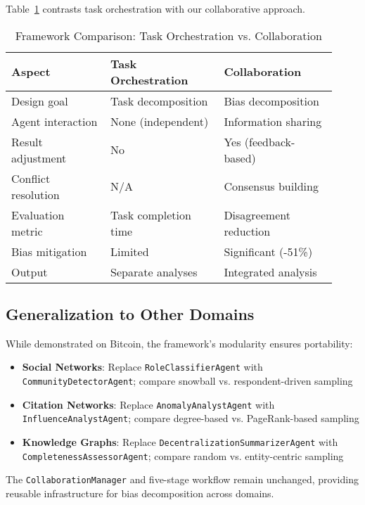 \documentclass[conference]{IEEEtran}
\begin{document}
Table~\ref{tab:framework-comparison} contrasts task orchestration with our collaborative approach.

\begin{table}[htbp]
\centering
\caption{Framework Comparison: Task Orchestration vs. Collaboration}
\label{tab:framework-comparison}
\small
\begin{tabular}{p{0.28\linewidth} p{0.32\linewidth} p{0.32\linewidth}}
\toprule
\textbf{Aspect} & \textbf{Task Orchestration} & \textbf{Collaboration} \\
\midrule
Design goal & Task decomposition & Bias decomposition \\
Agent interaction & None (independent) & Information sharing \\
Result adjustment & No & Yes (feedback-based) \\
Conflict resolution & N/A & Consensus building \\
Evaluation metric & Task completion time & Disagreement reduction \\
Bias mitigation & Limited & Significant (-51\%) \\
Output & Separate analyses & Integrated analysis \\
\bottomrule
\end{tabular}
\end{table}

\subsection{Generalization to Other Domains}

While demonstrated on Bitcoin, the framework's modularity ensures portability:
\begin{itemize}
    \item \textbf{Social Networks}: Replace \texttt{RoleClassifierAgent} with \texttt{CommunityDetectorAgent}; compare snowball vs. respondent-driven sampling
    \item \textbf{Citation Networks}: Replace \texttt{AnomalyAnalystAgent} with \texttt{InfluenceAnalystAgent}; compare degree-based vs. PageRank-based sampling  
    \item \textbf{Knowledge Graphs}: Replace \texttt{DecentralizationSummarizerAgent} with \texttt{CompletenessAssessorAgent}; compare random vs. entity-centric sampling
\end{itemize}

The \texttt{CollaborationManager} and five-stage workflow remain unchanged, providing reusable infrastructure for bias decomposition across domains.
\end{document}
